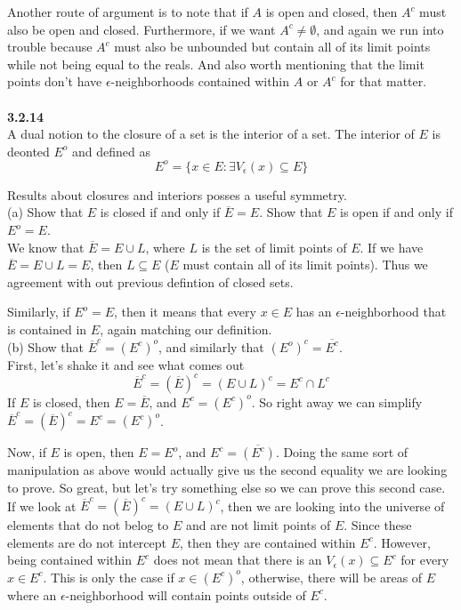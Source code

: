Another route of argument is to note that if $A$ is open and closed, then $A^c$ must also be open and closed.
Furthermore, if we want $A^c \neq \emptyset$, and again we run into trouble because $A^c$ must also be unbounded
but contain all of its limit points while not being equal to the reals.
And also worth mentioning that the limit points don't have $\epsilon$-neighborhoods contained within $A$ or $A^c$ for that matter.
\\~\\



\textbf{3.2.14}
\\

A dual notion to the closure of a set is the interior of a set.
The interior of $E$ is deonted $E^o$ and defined as
$$
E^o = \{ x\in E : \exists V_\epsilon (x) \subseteq E \}
$$

Results about closures and interiors posses a useful symmetry.
\\

(a) Show that $E$ is closed if and only if $\overline{E} = E$.
Show that $E$ is open if and only if $E^o = E$.
\\

We know that $\overline{E} = E \cup L$, where $L$ is the set of limit points of $E$.
If we have $\overline{E} = E \cup L = E$, then $L \subseteq E$ ($E$ must contain all of its limit points).
Thus we agreement with out previous defintion of closed sets.

Similarly, if $E^o = E$, then it means that every $x\in E$ has an $\epsilon$-neighborhood that is contained
in $E$, again matching our definition.
\\


(b) Show that $\overline{E}^c = (E^c)^o$, and similarly that $(E^o)^c = \overline{E^c}$.
\\

First, let's shake it and see what comes out
$$
\overline{E}^c = (\overline{E})^c = (E \cup L)^c = E^c \cap L^c
$$
If $E$ is closed, then $E=\overline{E}$, and $E^c = (E^c)^o$.
So right away we can simplify $\overline{E}^c = (\overline{E})^c = E^c = (E^c)^o$.

Now, if $E$ is open, then $E = E^o$, and $E^c = \overline{(E^c)}$.
Doing the same sort of manipulation as above would actually give us the second equality we are looking to prove.
So great, but let's try something else so we can prove this second case.
If we look at $\overline{E}^c = (\overline{E})^c = (E \cup L)^c$, then we are looking into the universe of elements
that do not belog to $E$ and are not limit points of $E$.
Since these elements are do not intercept $E$, then they are contained within $E^c$.
However, being contained within $E^c$ does not mean that there is an $V_\epsilon (x) \subseteq E^c$
for every $x\in E^c$.
This is only the case if $x\in (E^c)^o$, otherwise, there will be areas of $E$ where an $\epsilon$-neighborhood
will contain points outside of $E^c$.
\\~\\



